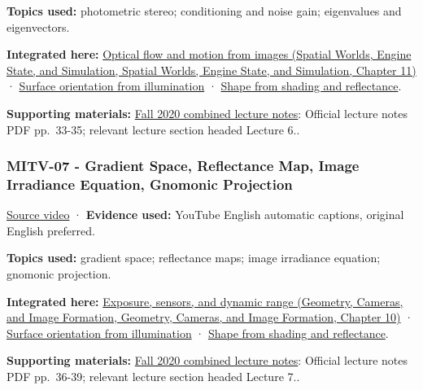 \textbf{Topics used:} photometric stereo; conditioning and noise gain; eigenvalues and eigenvectors.

\textbf{Integrated here:} \href{../05-Spatial-Worlds-Engine-State-and-Simulation/main.pdf\#nameddest=04-visual-computing-ii-ch030-optical-flow-and-motion-from-images}{Optical flow and motion from images (Spatial Worlds, Engine State, and Simulation, Spatial Worlds, Engine State, and Simulation, Chapter 11)} · \hyperref[04-visual-computing-ii-ch032-surface-orientation-from-illumination]{Surface orientation from illumination} · \hyperref[04-visual-computing-ii-ch032-shape-from-shading-and-reflectance]{Shape from shading and reflectance}.

\textbf{Supporting materials:} \href{https://ocw.mit.edu/courses/6-801-machine-vision-fall-2020/9ec44f69e72995c370b3797818ba01e6_MIT6_801F20_lectureNotes.pdf}{Fall 2020 combined lecture notes}: Official lecture notes PDF pp.~33-35; relevant lecture section headed Lecture 6..

\subsubsection{MITV-07 - Gradient Space, Reflectance Map, Image Irradiance Equation, Gnomonic Projection}\label{04-visual-computing-ii-ch036-mitv-07---gradient-space-reflectance-map-image-irradiance-equation-gnomonic-projection}

\href{https://www.youtube.com/watch?v=qqtEQsBjh28}{Source video} · \textbf{Evidence used:} YouTube English automatic captions, original English preferred.

\textbf{Topics used:} gradient space; reflectance maps; image irradiance equation; gnomonic projection.

\textbf{Integrated here:} \href{../03-Geometry-Cameras-and-Image-Formation/main.pdf\#nameddest=03-visual-computing-i-ch003-exposure-sensors-and-dynamic-range}{Exposure, sensors, and dynamic range (Geometry, Cameras, and Image Formation, Geometry, Cameras, and Image Formation, Chapter 10)} · \hyperref[04-visual-computing-ii-ch032-surface-orientation-from-illumination]{Surface orientation from illumination} · \hyperref[04-visual-computing-ii-ch032-shape-from-shading-and-reflectance]{Shape from shading and reflectance}.

\textbf{Supporting materials:} \href{https://ocw.mit.edu/courses/6-801-machine-vision-fall-2020/9ec44f69e72995c370b3797818ba01e6_MIT6_801F20_lectureNotes.pdf}{Fall 2020 combined lecture notes}: Official lecture notes PDF pp.~36-39; relevant lecture section headed Lecture 7..

